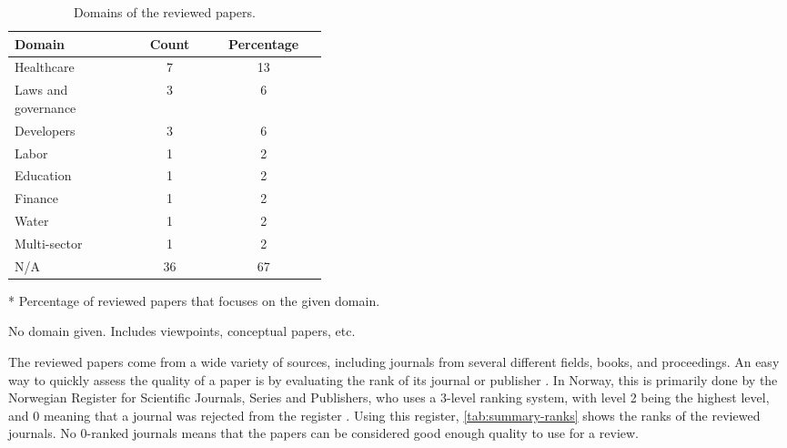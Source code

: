 \begin{table}[htpb]
    \centering
    \caption{Domains of the reviewed papers.}
    \label{tab:summary-domain}
    \begin{threeparttable}
    \begin{tabular}{p{0.4\linewidth}cc}
    \toprule
        \textbf{Domain} & \textbf{Count} & \textbf{Percentage}\tnote{*} \\
    \midrule
        Healthcare              & 7     & 13 \\ 
        Laws and governance     & 3     & 6 \\
        Developers              & 3     & 6 \\
        Labor                   & 1     & 2 \\
        Education               & 1     & 2 \\
        Finance                 & 1     & 2 \\
        Water                   & 1     & 2 \\
        Multi-sector            & 1     & 2 \\
        N/A\tnote{\textdagger}  & 36    & 67 \\ 
    \bottomrule
    \end{tabular}
    \begin{tablenotes}
        \footnotesize
        \item [*] Percentage of reviewed papers that focuses on the given domain.
        \item [\textdagger] No domain given. Includes viewpoints, conceptual papers, etc.
    \end{tablenotes}
\end{threeparttable}
\end{table}

The reviewed papers come from a wide variety of sources, including journals from several different fields, books, and proceedings. An easy way to quickly assess the quality of a paper is by evaluating the rank of its journal or publisher \parencite{Keathley-Herring_2016}. In Norway, this is primarily done by the Norwegian Register for Scientific Journals, Series and Publishers, who uses a 3-level ranking system, with level 2 being the highest level, and 0 meaning that a journal was rejected from the register \parencite{kanalregisteret}. Using this register, \autoref{tab:summary-ranks} shows the ranks of the reviewed journals. No 0-ranked journals means that the papers can be considered good enough quality to use for a review.

